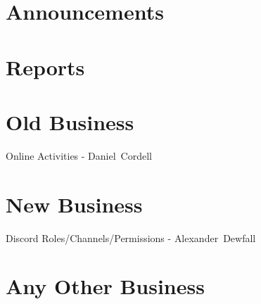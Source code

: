 \documentclass[11pt,hacksoc,agenda]{meetingmins}
\begin{document}
\maketitle

\section{Announcements}

\section{Reports}


\section{Old Business}
\begin{items}
\item {Online Activities - Daniel~Cordell}
\end{items}

\section{New Business}
\begin{items}
\item {Discord Roles/Channels/Permissions - Alexander~Dewfall}
\end{items}

\section{Any Other Business}

\vspace{1em}
\nextmeeting{}
\end{document}
